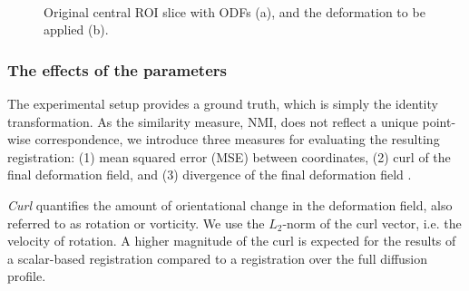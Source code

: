 \documentclass[twocolumn]{svjour3}
\begin{document}
\begin{figure}[ht]
  \centering
  \\
  \caption{Original central ROI slice with ODFs (a), and the deformation to be applied
    (b).}
  \label{fig:cc_slice2}
\end{figure}

\subsubsection{The effects of the parameters}
The experimental setup provides a ground truth, which is simply the identity
transformation. As the similarity measure, NMI, does not reflect a unique point-wise
correspondence, we introduce three measures for evaluating the resulting registration: (1)
mean squared error (MSE) between coordinates, (2) curl of the final deformation field, and
(3) divergence of the final deformation field \cite{helmholz1858}.

\textit{Curl}
quantifies the amount of orientational change in the deformation field, also referred to
as rotation or vorticity. We use the $L_2$-norm of the curl vector, i.e. the velocity of
rotation. A higher magnitude of the curl is expected for the results of a scalar-based
registration compared to a registration over the full diffusion profile.
\end{document}
